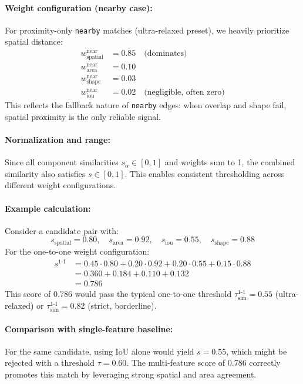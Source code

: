 \paragraph{Weight configuration (nearby case):}
For proximity-only \texttt{nearby} matches (ultra-relaxed preset), we heavily prioritize spatial distance:
\[
\begin{aligned}
w_{\text{spatial}}^{\text{near}} &= 0.85 \quad \text{(dominates)} \\
w_{\text{area}}^{\text{near}} &= 0.10 \\
w_{\text{shape}}^{\text{near}} &= 0.03 \\
w_{\text{iou}}^{\text{near}} &= 0.02 \quad \text{(negligible, often zero)}
\end{aligned}
\]
This reflects the fallback nature of \texttt{nearby} edges: when overlap and shape fail, spatial proximity is the only reliable signal.

\paragraph{Normalization and range:}
Since all component similarities $s_\alpha \in [0,1]$ and weights sum to 1, the combined similarity also satisfies $s \in [0,1]$. This enables consistent thresholding across different weight configurations.

\paragraph{Example calculation:}
Consider a candidate pair with:
\[
s_{\text{spatial}} = 0.80, \quad s_{\text{area}} = 0.92, \quad s_{\text{iou}} = 0.55, \quad s_{\text{shape}} = 0.88
\]
For the one-to-one weight configuration:
\[
\begin{aligned}
s^{\text{1-1}} &= 0.45 \cdot 0.80 + 0.20 \cdot 0.92 + 0.20 \cdot 0.55 + 0.15 \cdot 0.88 \\
&= 0.360 + 0.184 + 0.110 + 0.132 \\
&= 0.786
\end{aligned}
\]
This score of 0.786 would pass the typical one-to-one threshold $\tau_{\text{sim}}^{\text{1-1}} = 0.55$ (ultra-relaxed) or $\tau_{\text{sim}}^{\text{1-1}} = 0.82$ (strict, borderline).

\paragraph{Comparison with single-feature baseline:}
For the same candidate, using IoU alone would yield $s = 0.55$, which might be rejected with a threshold $\tau = 0.60$. The multi-feature score of 0.786 correctly promotes this match by leveraging strong spatial and area agreement.

